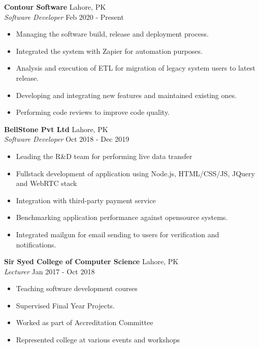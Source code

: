 \documentclass[a4paper]{article}
\begin{document}
\textbf{Contour Software} \hfill Lahore, PK\\
\textit{Software Developer} \hfill Feb 2020 - Present\\
\vspace{-1mm}
\begin{itemize} \itemsep 1pt
	\item Managing the software build, release and deployment process.
	\item Integrated the system with Zapier for automation purposes.
	\item Analysis and execution of ETL for migration of legacy system users to latest release.
	\item Developing and integrating new features and maintained existing ones.
	\item Performing code reviews to improve code quality.
\end{itemize}
\textbf{BellStone Pvt Ltd} \hfill Lahore, PK\\
\textit{Software Developer} \hfill Oct 2018 - Dec 2019\\
\vspace{-1mm}
\begin{itemize} \itemsep 1pt
	\item Leading the R\&D team for performing live data transfer
	\item Fullstack development of application using Node.js, HTML/CSS/JS, JQuery and WebRTC stack
	\item Integration with third-party payment service
	\item Benchmarking application performance against opensource systems.
	\item Integrated mailgun for email sending to users for verification and notifications.
\end{itemize}
\textbf{Sir Syed College of Computer Science} \hfill Lahore, PK\\
\textit{Lecturer} \hfill Jan 2017 - Oct 2018\\
\vspace{-1mm}
\begin{itemize} \itemsep 1pt
	\item Teaching software development courses
	\item Supervised Final Year Projects.
	\item Worked as part of Accreditation Committee
	\item Represented college at various events and workshops
\end{itemize}
\end{document}

